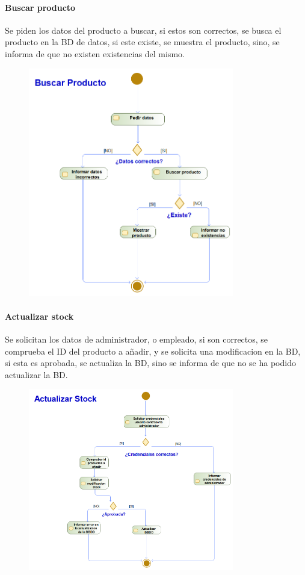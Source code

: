 \paragraph{Buscar producto}
Se piden los datos del producto a buscar, si estos son correctos, se busca el producto en la BD de datos, si este existe, se muestra el producto, sino, se informa de que no existen existencias del mismo.
\begin{figure}[H]
    \centering
    \includegraphics[width=0.8\textwidth]{Use_Cases/ProyectoIS_BuscarProducto.png}
\end{figure}
\newpage
\paragraph{Actualizar stock}
Se solicitan los datos de administrador, o empleado, si son correctos, se comprueba el ID del producto a añadir, y se solicita una modificacion en la BD, si esta es aprobada, se actualiza la BD, sino se informa de que no se ha podido actualizar la BD.
\begin{figure}[H]
    \centering
    \includegraphics[width=0.8\textwidth]{Use_Cases/ProyectoIS_ActualizarStock.png}
\end{figure}
\newpage

